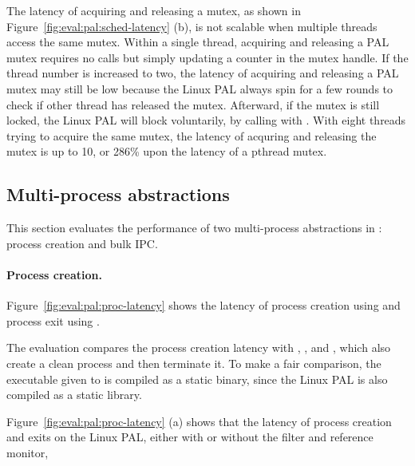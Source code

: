 The latency of acquiring and releasing a mutex,
as shown in Figure~\ref{fig:eval:pal:sched-latency} (b),
is not scalable when multiple threads
access the same mutex.
Within a single thread,
acquiring and releasing a PAL mutex requires no  calls
but simply updating a counter
in the mutex handle.
If the thread number is increased to two,
the latency of acquiring and releasing a PAL mutex may still be low
because
the Linux PAL always spin for a few rounds to check if
other thread has released the mutex.
Afterward, if the mutex is still locked,
the Linux PAL will block voluntarily,
by calling  with .
With eight threads trying to acquire the same mutex, the latency of acquring and releasing the mutex
is up to \roughly{}10\usec{}, or 286\% upon the latency of a pthread mutex.
 






\subsection{Multi-process abstractions}
\label{sec:eval:pal:multi-proc}

This section evaluates the performance of two multi-process abstractions in \thehostabi:
process creation and bulk IPC.



\paragraph{Process creation.}
Figure~\ref{fig:eval:pal:proc-latency}
shows the latency of process creation using 
and process exit
using .



The evaluation compares the process creation latency
with , , and ,
which also create a clean process
and then terminate it.
To make a fair comparison,
the executable given to 
is compiled as a static binary,
since the Linux PAL is also compiled as a static library.



Figure~\ref{fig:eval:pal:proc-latency} (a)
shows that the latency of process creation and exits on the Linux PAL, either with or without the \seccomp{} filter and reference monitor,
 


